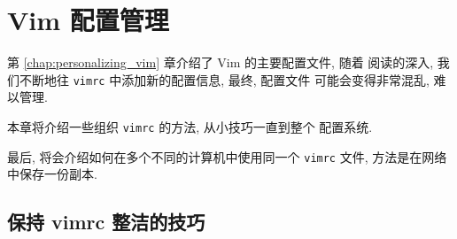 \chapter{Vim 配置管理}
\label{chap:vim_configuration_alternatives}

第 \ref{chap:personalizing_vim} 章介绍了 Vim 的主要配置文件, 随着
阅读的深入, 我们不断地往 \texttt{vimrc} 中添加新的配置信息, 最终, 配置文件
可能会变得非常混乱, 难以管理.

本章将介绍一些组织 \texttt{vimrc} 的方法, 从小技巧一直到整个
配置系统.

最后, 将会介绍如何在多个不同的计算机中使用同一个 \texttt{vimrc} 文件,
方法是在网络中保存一份副本.

\section{保持 vimrc 整洁的技巧}
\label{sec:tips_for_keeping_your_vimrc_file_clean}

